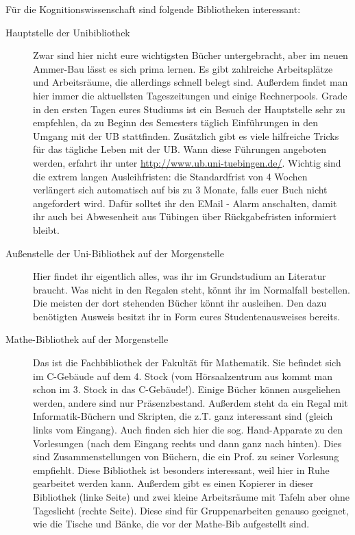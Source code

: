 \vfill

Für die Kognitionswissenschaft sind folgende Bibliotheken interessant:
\begin{description}
	\item[Hauptstelle der Unibibliothek] Zwar sind hier nicht eure wichtigsten
	Bücher untergebracht, aber im neuen Ammer-Bau lässt es sich prima
	lernen. Es gibt zahlreiche Arbeitsplätze und Arbeitsräume, die
	allerdings schnell belegt sind. Außerdem findet man hier immer die
	aktuellsten Tageszeitungen und einige Rechnerpools.
	Grade in den ersten Tagen eures Studiums ist ein Besuch der Hauptstelle
	sehr zu empfehlen, da zu Beginn des Semesters täglich Einführungen in den Umgang mit der UB stattfinden. Zusätzlich gibt es viele hilfreiche Tricks für das tägliche Leben mit der UB. Wann diese Führungen angeboten werden, erfahrt ihr unter  \url{http://www.ub.uni-tuebingen.de/}. Wichtig sind die extrem langen Ausleihfristen: die Standardfrist von 4 Wochen verlängert sich automatisch auf bis zu 3 Monate, falls euer Buch nicht angefordert wird. Dafür solltet ihr den EMail - Alarm anschalten, damit ihr auch bei Abwesenheit aus Tübingen über Rückgabefristen informiert bleibt. 
	
	\item[Außenstelle der Uni-Bibliothek auf der Morgenstelle]
	Hier findet ihr eigentlich alles, was ihr im Grundstudium an
	Literatur braucht.  Was nicht in den Regalen steht, könnt ihr
	im Normalfall bestellen.  Die meisten der dort stehenden Bücher könnt ihr
	ausleihen. Den dazu benötigten Ausweis besitzt ihr in Form eures Studentenausweises bereits.
	
	\item[Mathe-Bibliothek auf der Morgenstelle]
	Das ist die Fachbibliothek der Fakultät für Mathematik. Sie
	befindet sich im C-Gebäude auf dem 4. Stock (vom
	Hörsaalzentrum aus kommt man schon im 3. Stock in das
	C-Gebäude!). Einige Bücher können ausgeliehen werden,
	andere sind nur Präsenzbestand.  Außerdem steht da ein Regal
	mit Informatik-Büchern und Skripten, die z.T. ganz
	interessant sind (gleich links vom Eingang).  Auch finden sich
	hier die sog. Hand-Apparate zu den Vorlesungen (nach dem
	Eingang rechts und dann ganz nach hinten).  Dies sind
	Zusammenstellungen von Büchern, die ein Prof. zu seiner
	Vorlesung empfiehlt.  Diese Bibliothek ist besonders
	interessant, weil hier in Ruhe gearbeitet werden kann.
	Außerdem gibt es einen Kopierer in dieser Bibliothek (linke
	Seite) und zwei kleine Arbeitsräume mit Tafeln aber ohne
	Tageslicht (rechte Seite).  Diese sind für Gruppenarbeiten
	genauso geeignet, wie die Tische und Bänke, die vor der
	Mathe-Bib aufgestellt sind.
	

\end{description}
